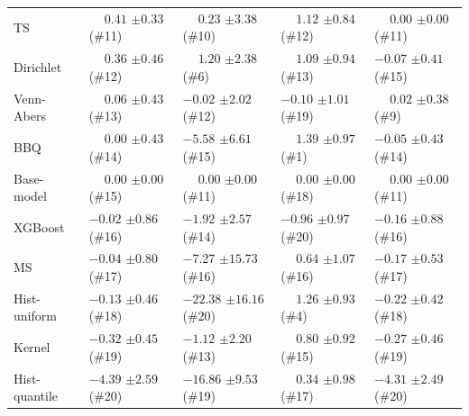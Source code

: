 \begin{tabular}{lllll}
TS & $\phantom{-}0.41$ {\tiny $\pm 0.33$} (\#11) & $\phantom{-}0.23$ {\tiny $\pm 3.38$} (\#10) & $\phantom{-}1.12$ {\tiny $\pm 0.84$} (\#12) & $\phantom{-}0.00$ {\tiny $\pm 0.00$} (\#11) \\
Dirichlet & $\phantom{-}0.36$ {\tiny $\pm 0.46$} (\#12) & $\phantom{-}1.20$ {\tiny $\pm 2.38$} (\#6) & $\phantom{-}1.09$ {\tiny $\pm 0.94$} (\#13) & $-0.07$ {\tiny $\pm 0.41$} (\#15) \\
Venn-Abers & $\phantom{-}0.06$ {\tiny $\pm 0.43$} (\#13) & $-0.02$ {\tiny $\pm 2.02$} (\#12) & $-0.10$ {\tiny $\pm 1.01$} (\#19) & $\phantom{-}0.02$ {\tiny $\pm 0.38$} (\#9) \\
BBQ & $\phantom{-}0.00$ {\tiny $\pm 0.43$} (\#14) & $-5.58$ {\tiny $\pm 6.61$} (\#15) & $\phantom{-}1.39$ {\tiny $\pm 0.97$} (\#1) & $-0.05$ {\tiny $\pm 0.43$} (\#14) \\
Base-model & $\phantom{-}0.00$ {\tiny $\pm 0.00$} (\#15) & $\phantom{-}0.00$ {\tiny $\pm 0.00$} (\#11) & $\phantom{-}0.00$ {\tiny $\pm 0.00$} (\#18) & $\phantom{-}0.00$ {\tiny $\pm 0.00$} (\#11) \\
XGBoost & $-0.02$ {\tiny $\pm 0.86$} (\#16) & $-1.92$ {\tiny $\pm 2.57$} (\#14) & $-0.96$ {\tiny $\pm 0.97$} (\#20) & $-0.16$ {\tiny $\pm 0.88$} (\#16) \\
MS & $-0.04$ {\tiny $\pm 0.80$} (\#17) & $-7.27$ {\tiny $\pm 15.73$} (\#16) & $\phantom{-}0.64$ {\tiny $\pm 1.07$} (\#16) & $-0.17$ {\tiny $\pm 0.53$} (\#17) \\
Hist-uniform & $-0.13$ {\tiny $\pm 0.46$} (\#18) & $-22.38$ {\tiny $\pm 16.16$} (\#20) & $\phantom{-}1.26$ {\tiny $\pm 0.93$} (\#4) & $-0.22$ {\tiny $\pm 0.42$} (\#18) \\
Kernel & $-0.32$ {\tiny $\pm 0.45$} (\#19) & $-1.12$ {\tiny $\pm 2.20$} (\#13) & $\phantom{-}0.80$ {\tiny $\pm 0.92$} (\#15) & $-0.27$ {\tiny $\pm 0.46$} (\#19) \\
Hist-quantile & $-4.39$ {\tiny $\pm 2.59$} (\#20) & $-16.86$ {\tiny $\pm 9.53$} (\#19) & $\phantom{-}0.34$ {\tiny $\pm 0.98$} (\#17) & $-4.31$ {\tiny $\pm 2.49$} (\#20) \\
\bottomrule
\end{tabular}
